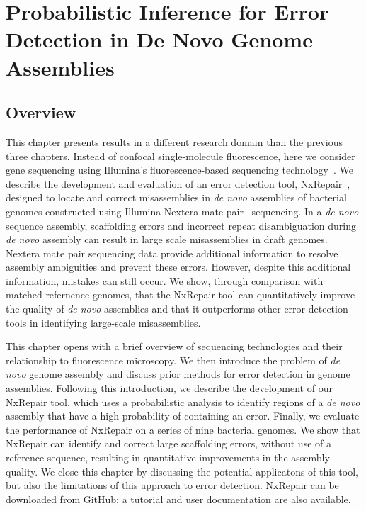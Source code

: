 \chapter{Probabilistic Inference for Error Detection in De Novo Genome Assemblies}
\label{chap:illumina}
\section{Overview}
This chapter presents results in a different research domain than the previous three chapters. Instead of confocal single-molecule  fluorescence, here we consider gene sequencing using Illumina's fluorescence-based sequencing technology~\cite{bentley2008}. We describe the development and evaluation of an error detection tool, NxRepair~\cite{murphy2015}, designed to locate and correct misassemblies in \textit{de novo} assemblies of bacterial genomes constructed using Illumina Nextera mate pair~\cite{nextera2012} sequencing. In a \textit{de novo} sequence assembly, scaffolding errors and incorrect repeat disambiguation during \textit{de novo} assembly can result in large scale misassemblies in draft genomes. Nextera mate pair sequencing data provide additional information to resolve assembly ambiguities and prevent these errors. However, despite this additional information, mistakes can still occur. We show, through comparison with matched refernence genomes, that the NxRepair tool can quantitatively improve the quality of \textit{de novo} assemblies and that it outperforms other error detection tools in identifying large-scale misassemblies.

This chapter opens with a brief overview of sequencing technologies and their relationship to fluorescence microscopy. We then introduce the problem of \textit{de novo} genome assembly and discuss prior methods for error detection in genome assemblies. Following this introduction, we describe the development of our NxRepair tool, which uses a probabilistic analysis to identify regions of a \textit{de novo} assembly that have a high probability of containing an error. Finally, we evaluate the performance of NxRepair on a series of nine bacterial genomes. We show that NxRepair can identify and correct large scaffolding errors, without use of a reference sequence, resulting in quantitative improvements in the assembly quality. We close this chapter by discussing the potential applicatons of this tool, but also the limitations of this approach to error detection. NxRepair can be downloaded from GitHub; a tutorial and user documentation are also available.
 

